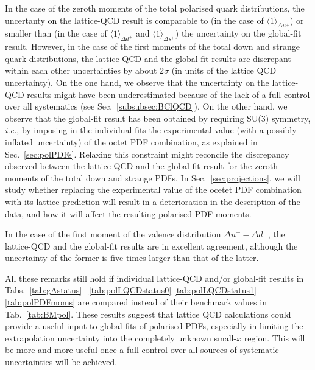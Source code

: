 In the case of the zeroth moments of the total polarised quark distributions,
the uncertanty on the lattice-QCD result is comparable to (in the case
of $\langle 1 \rangle_{\Delta u^+}$) or smaller than (in the case
of $\langle 1 \rangle_{\Delta d^+}$ and $\langle 1 \rangle_{\Delta s^+}$)
the uncertainty on the global-fit result.
%
However, in the case of the first moments of the total down and strange quark 
distributions, the lattice-QCD and the global-fit results are discrepant
within each other uncertainties by about 2$\sigma$ (in units of the
lattice QCD uncertainty).
%
On the one hand, we observe that the uncertainty on the lattice-QCD results 
might have been underestimated because of the lack of a full control over
all systematics (see Sec.~\ref{subsubsec:BClQCD}).
%
On the other hand, we observe that the global-fit result has been obtained
by requiring SU(3) symmetry, {\it i.e.}, by imposing in the individual fits 
the experimental value (with a possibly inflated uncertainty) of the octet PDF 
combination, as explained in Sec.~\ref{sec:polPDFs}.
%
Relaxing this constraint might reconcile the discrepancy observed between 
the lattice-QCD and the global-fit result for the zeroth moments of the 
total down and strange PDFs.
%
In Sec.~\ref{sec:projections}, we will study whether replacing the experimental
value of the ocetet PDF combination with its lattice prediction
will result in a deterioration in the description of the data, and how it will
affect the resulting polarised PDF moments.
 
In the case of the first moment of the valence distribution 
$\Delta u^--\Delta d^-$, the lattice-QCD and the global-fit results are 
in excellent agreement, although the uncertainty of the former is five times
larger than that of the latter.

All these remarks still hold if individual lattice-QCD and/or global-fit
results in Tabs.~\ref{tab:gAstatus}-~\ref{tab:polLQCDstatus0}-\ref{tab:polLQCDstatus1}-\ref{tab:polPDFmoms}
are compared instead of their benchmark values in Tab.~\ref{tab:BMpol}.
%
These results suggest that lattice QCD calculations could provide a useful
input to global fits of polarised PDFs, especially in limiting the
extrapolation uncertainty into the completely unknown small-$x$ region.
%
This will be more and more useful once a full control over all sources of
systematic uncertainties will be achieved.









